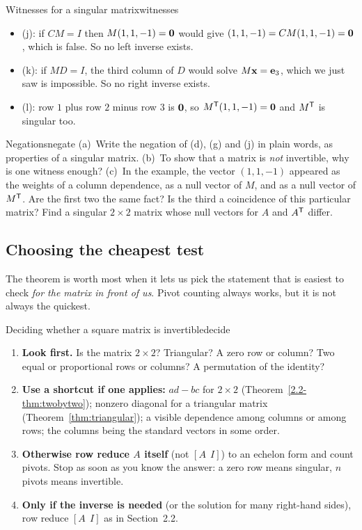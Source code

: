 \documentclass[11pt]{article}
\begin{document}
\begin{exmp}{Witnesses for a singular matrix}{witnesses}
\begin{itemize}
  \item (j): if $CM=I$ then $M(1,1,-1)=\mathbf{0}$ would give $(1,1,-1)=CM(1,1,-1)=\mathbf{0}$, which is false. So no left inverse exists.
  \item (k): if $MD=I$, the third column of $D$ would solve $M\mathbf{x}=\mathbf{e}_3$, which we just saw is impossible. So no right inverse exists.
  \item (l): row $1$ plus row $2$ minus row $3$ is $\mathbf{0}$, so $M^{\mathsf T}(1,1,-1)=\mathbf{0}$ and $M^{\mathsf T}$ is singular too.
\end{itemize}
\end{exmp}

\begin{think}{Negations}{negate}
(a)~Write the negation of (d), (g) and (j) in plain words, as properties of a singular matrix. (b)~To show that a matrix is \emph{not} invertible, why is one witness enough? (c)~In the example, the vector $(1,1,-1)$ appeared as the weights of a column dependence, as a null vector of $M$, and as a null vector of $M^{\mathsf T}$. Are the first two the same fact? Is the third a coincidence of this particular matrix? Find a singular $2\times2$ matrix whose null vectors for $A$ and $A^{\mathsf T}$ differ.
\end{think}

\subsection*{Choosing the cheapest test}

The theorem is worth most when it lets us pick the statement that is easiest to check \emph{for the matrix in front of us}. Pivot counting always works, but it is not always the quickest.

\begin{proc}{Deciding whether a square matrix is invertible}{decide}
\begin{enumerate}
  \item \textbf{Look first.} Is the matrix $2\times2$? Triangular? A zero row or column? Two equal or proportional rows or columns? A permutation of the identity?
  \item \textbf{Use a shortcut if one applies:} $ad-bc$ for $2\times2$ (Theorem~\ref{2.2-thm:twobytwo}); nonzero diagonal for a triangular matrix (Theorem~\ref{thm:triangular}); a visible dependence among columns or among rows; the columns being the standard vectors in some order.
  \item \textbf{Otherwise row reduce $A$ itself} (not $[A\ \ I]$) to an echelon form and count pivots. Stop as soon as you know the answer: a zero row means singular, $n$ pivots means invertible.
  \item \textbf{Only if the inverse is needed} (or the solution for many right-hand sides), row reduce $[A\ \ I]$ as in Section~2.2.
\end{enumerate}
\end{proc}
\end{document}
